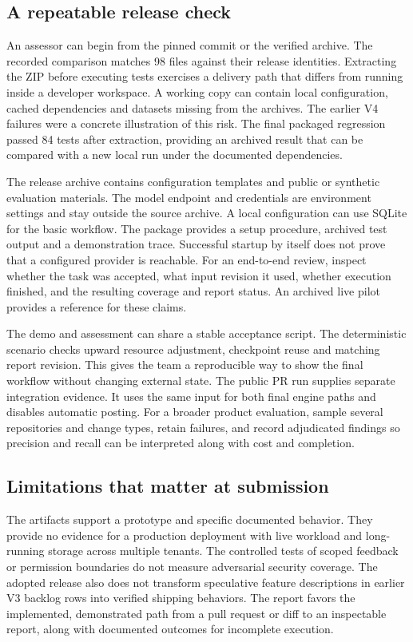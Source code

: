 \documentclass[journal,compsoc]{IEEEtran}
\begin{document}
\subsection{A repeatable release check}
An assessor can begin from the pinned commit or the verified archive. The recorded comparison matches 98 files against their release identities. Extracting the ZIP before executing tests exercises a delivery path that differs from running inside a developer workspace. A working copy can contain local configuration, cached dependencies and datasets missing from the archives. The earlier V4 failures were a concrete illustration of this risk. The final packaged regression passed 84 tests after extraction, providing an archived result that can be compared with a new local run under the documented dependencies.

The release archive contains configuration templates and public or synthetic evaluation materials. The model endpoint and credentials are environment settings and stay outside the source archive. A local configuration can use SQLite for the basic workflow. The package provides a setup procedure, archived test output and a demonstration trace. Successful startup by itself does not prove that a configured provider is reachable. For an end-to-end review, inspect whether the task was accepted, what input revision it used, whether execution finished, and the resulting coverage and report status. An archived live pilot provides a reference for these claims.

The demo and assessment can share a stable acceptance script. The deterministic scenario checks upward resource adjustment, checkpoint reuse and matching report revision. This gives the team a reproducible way to show the final workflow without changing external state. The public PR run supplies separate integration evidence. It uses the same input for both final engine paths and disables automatic posting. For a broader product evaluation, sample several repositories and change types, retain failures, and record adjudicated findings so precision and recall can be interpreted along with cost and completion.

\subsection{Limitations that matter at submission}
The artifacts support a prototype and specific documented behavior. They provide no evidence for a production deployment with live workload and long-running storage across multiple tenants. The controlled tests of scoped feedback or permission boundaries do not measure adversarial security coverage. The adopted release also does not transform speculative feature descriptions in earlier V3 backlog rows into verified shipping behaviors. The report favors the implemented, demonstrated path from a pull request or diff to an inspectable report, along with documented outcomes for incomplete execution.
\end{document}
